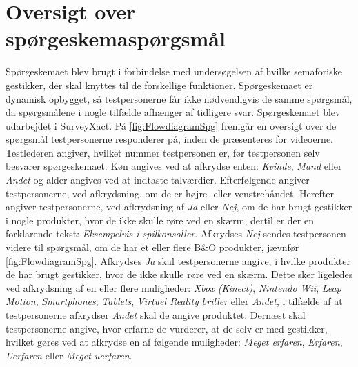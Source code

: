 \chapter{Oversigt over spørgeskemaspørgsmål}
\label{app:FlowdiagramSPG}
%
Spørgeskemaet blev brugt i forbindelse med undersøgelsen af hvilke semaforiske gestikker, der skal knyttes til de forskellige funktioner. Spørgeskemaet er dynamisk opbygget, så testpersonerne får ikke nødvendigvis de samme spørgsmål, da spørgsmålene i nogle tilfælde afhænger af tidligere svar. Spørgeskemaet blev udarbejdet i SurveyXact.\blankline
%
På \autoref{fig:FlowdiagramSpg} fremgår en oversigt over de spørgsmål testpersonerne responderer på, inden de præsenteres for videoerne. Testlederen angiver, hvilket nummer testpersonen er, før testpersonen selv besvarer spørgeskemaet. Køn angives ved at afkrydse enten: \textit{Kvinde}, \textit{Mand} eller \textit{Andet} og alder angives ved at indtaste talværdier. Efterfølgende angiver testpersonerne, ved afkrydsning, om de er højre- eller venstrehåndet. Herefter angiver testpersonerne, ved afkrydsning af \textit{Ja} eller \textit{Nej}, om de har brugt gestikker i nogle produkter, hvor de ikke skulle røre ved en skærm, dertil er der en forklarende tekst: \textit{Eksempelvis i spilkonsoller}. Afkrydses \textit{Nej} sendes testpersonen videre til spørgsmål, om de har et eller flere B$\&$O produkter, jævnfør \autoref{fig:FlowdiagramSpg}. Afkrydses \textit{Ja} skal testpersonerne angive, i hvilke produkter de har brugt gestikker, hvor de ikke skulle røre ved en skærm. Dette sker ligeledes ved afkrydsning af en eller flere muligheder: \textit{Xbox (Kinect)}, \textit{Nintendo Wii}, \textit{Leap Motion}, \textit{Smartphones}, \textit{Tablets}, \textit{Virtuel Reality briller} eller \textit{Andet}, i tilfælde af at testpersonerne afkrydser \textit{Andet} skal de angive produktet. Dernæst skal testpersonerne angive, hvor erfarne de vurderer, at de selv er med gestikker, hvilket gøres ved at afkrydse en af følgende muligheder: \textit{Meget erfaren}, \textit{Erfaren}, \textit{Uerfaren} eller \textit{Meget uerfaren}. 

